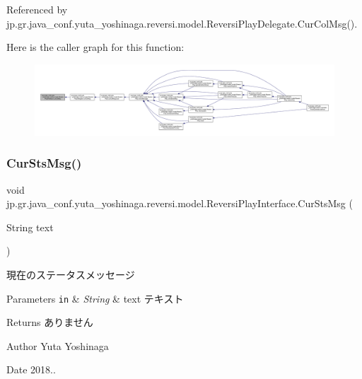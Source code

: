 Referenced by jp.\+gr.\+java\+\_\+conf.\+yuta\+\_\+yoshinaga.\+reversi.\+model.\+Reversi\+Play\+Delegate.\+Cur\+Col\+Msg().

Here is the caller graph for this function\+:
\nopagebreak
\begin{figure}[H]
\begin{center}
\leavevmode
\includegraphics[width=350pt]{interfacejp_1_1gr_1_1java__conf_1_1yuta__yoshinaga_1_1reversi_1_1model_1_1_reversi_play_interface_a73764de038c314fd103a91d402049a0c_icgraph}
\end{center}
\end{figure}
\mbox{\label{interfacejp_1_1gr_1_1java__conf_1_1yuta__yoshinaga_1_1reversi_1_1model_1_1_reversi_play_interface_ad812b3735df400b42916b15e5c3ff9db}} 
\subsubsection{\texorpdfstring{Cur\+Sts\+Msg()}{CurStsMsg()}}
{\footnotesize\ttfamily void jp.\+gr.\+java\+\_\+conf.\+yuta\+\_\+yoshinaga.\+reversi.\+model.\+Reversi\+Play\+Interface.\+Cur\+Sts\+Msg (\begin{DoxyParamCaption}\item[{String}]{text }\end{DoxyParamCaption})}



現在のステータスメッセージ 


\begin{DoxyParams}[1]{Parameters}
\mbox{\tt in}  & {\em String} & text テキスト \\
\hline
\end{DoxyParams}
\begin{DoxyReturn}{Returns}
ありません 
\end{DoxyReturn}
\begin{DoxyAuthor}{Author}
Yuta Yoshinaga 
\end{DoxyAuthor}
\begin{DoxyDate}{Date}
2018.. 
\end{DoxyDate}


